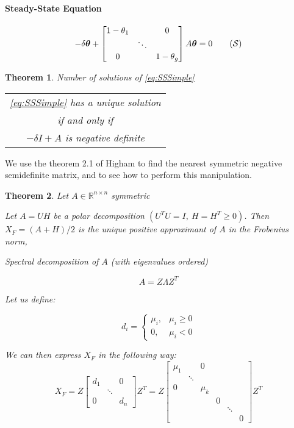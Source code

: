 \documentclass[12pt]{article}
\newtheorem{theorem}{Theorem}
\begin{document}
\paragraph{Steady-State Equation}

\[ -\delta \bm{\theta} + \begin{bmatrix} 1- \theta_1 & & 0 \\  & \ddots & \\ 0 & & 1-\theta_g \end{bmatrix} A \bm{\theta} = 0 
\tag{$\mathcal{S}$}
\]


\begin{theorem} Number of solutions of \eqref{eq:SSSimple}
 \begin{center}
\begin{tabular}{c}
\eqref{eq:SSSimple} has a unique solution \\
if and only if \\
$-\delta I + A$ is negative definite \end{tabular} \end{center}
\end{theorem}


We use the theorem 2.1 of Higham \cite{highamtheorem} to find the nearest symmetric negative semidefinite matrix, and to see how to perform this manipulation.

\begin{theorem}
Let $A \in \mathbb{R}^{n \times n}$ symmetric

Let $A=UH$ be a polar decomposition $(U^T U = I, \ H = H^T \geq 0)$. Then $X_F = (A+H)/2$ is the unique positive approximant of $A$ in the Frobenius norm, 

Spectral decomposition of $A$ (with eigenvalues ordered)

\[ A = Z \Lambda Z^T \]

Let us define:

\[ d_i = \left\{ \begin{array}{ll} 
\mu_i, & \mu_i \geq 0 \\
0, & \mu_i<0 \end{array} \right.
\tag{2.1} \]

We can then express $X_F$ in the following way:
\[ X_F = Z  \begin{bmatrix} d_1 & & 0 \\  & \ddots & \\ 0 & & d_n \end{bmatrix}  Z^T =  Z  \begin{bmatrix} \mu_1 & & 0 & & &  \\  & \ddots  & & & &  \\ 0 &  & \mu_k & & &  \\  &   & & 0 & &  \\ \ &   & & &\ddots &  \\  & & &&& 0 \end{bmatrix}  Z^T  \tag{2.2} \]

\end{theorem}
\end{document}
